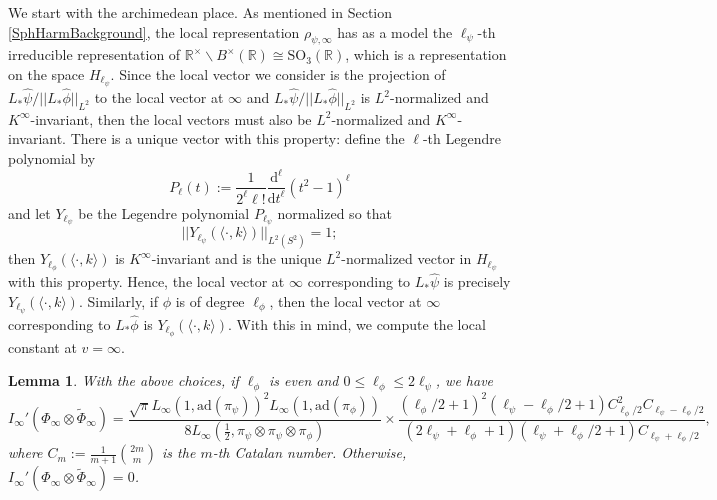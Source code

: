 \documentclass[11pt]{amsart}
\newtheorem{lemma}[theorem]{Lemma}
\theoremstyle{definition}
\begin{document}
We start with the archimedean place. As mentioned in Section \ref{SphHarmBackground}, the local representation $\rho_{\psi,\infty}$ has as a model the $\ell_{\psi}$-th irreducible representation of $\mathbb{R}^{\times} \backslash B^{\times}(\mathbb{R}) \cong \mathrm{SO}_{3}(\mathbb{R})$, which is a representation on the space $H_{\ell_{\psi}}$. Since the local vector we consider is the projection of $L_{*}\widehat{\psi} / ||L_{*}\widehat{\phi}||_{L^2}$ to the local vector at $\infty$ and $L_{*}\widehat{\psi}/ ||L_{*}\widehat{\phi}||_{L^2}$ is $L^2$-normalized and $K^{\infty}$-invariant, then the local vectors must also be $L^2$-normalized and $K^{\infty}$-invariant. There is a unique vector with this property: define the $\ell$-th Legendre polynomial by $$P_{\ell}(t) := \frac{1}{2^{\ell} \ell!} \frac{\mathrm{d}^{\ell}}{\mathrm{d}t^{\ell}}(t^2-1)^{\ell}$$ and let $Y_{\ell_{\psi}}$ be the Legendre polynomial $P_{\ell_{\psi}}$ normalized so that $$||Y_{\ell_{\psi}}(\langle \cdot, k\rangle )||_{L^2(S^2)}=1;$$ then $Y_{\ell_{\phi}}(\langle \cdot, k\rangle )$ is $K^{\infty}$-invariant and is the unique $L^2$-normalized vector in $H_{\ell_{\psi}}$ with this property. Hence, the local vector at $\infty$ corresponding to $L_{*}\widehat{\psi}$ is precisely $Y_{\ell_{\psi}}(\langle \cdot, k\rangle )$. Similarly, if $\phi$ is of degree $\ell_{\phi}$, then the local vector at $\infty$ corresponding to $L_{*}\widehat{\phi}$ is $Y_{\ell_{\phi}}(\langle \cdot, k\rangle )$. With this in mind, we compute the local constant at $v=\infty$.

\begin{lemma}\label{LocalConstInfty}
With the above choices, if $\ell_{\phi}$ is even and $0\leq \ell_{\phi} \leq 2\ell_{\psi}$, we have
\begin{equation*}
    I_{\infty}'(\Phi_{\infty} \otimes \widetilde{\Phi}_{\infty}) = \frac{\sqrt{\pi} L_{\infty}(1,\mathrm{ad}(\pi_{\psi}))^2 L_{\infty}(1,\mathrm{ad}(\pi_{\phi}))}{8 L_{\infty}(\frac{1}{2},\pi_{\psi}\otimes \pi_{\psi} \otimes \pi_{\phi})} \times \frac{(\ell_{\phi}/2+1)^2 (\ell_{\psi} - \ell_{\phi}/2 + 1)C_{\ell_{\phi}/2}^{2} C_{\ell_{\psi} - \ell_{\phi}/2}}{(2\ell_{\psi} + \ell_{\phi} + 1) (\ell_{\psi} + \ell_{\phi}/2 + 1) C_{\ell_{\psi} + \ell_{\phi}/2}},
\end{equation*}
where $C_m := \frac{1}{m+1}\binom{2m}{m}$ is the $m$-th Catalan number. Otherwise, $I_{\infty}'(\Phi_{\infty} \otimes \widetilde{\Phi}_{\infty}) = 0$.
\end{lemma}
\end{document}
